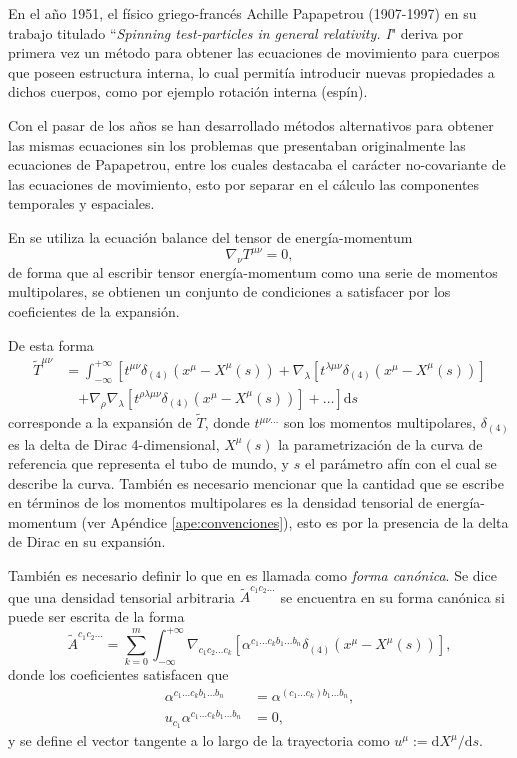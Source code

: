 En el año 1951, el físico griego-francés Achille Papapetrou (1907-1997) en su trabajo titulado ``\textit{Spinning test-particles in general relativity. I}" \cite{Papapetrou2,Papapetrou1} deriva por primera vez un método para obtener las ecuaciones de movimiento para cuerpos que poseen estructura interna, lo cual permitía introducir nuevas propiedades a dichos cuerpos, como por ejemplo rotación interna (espín). 

Con el pasar de los años se han desarrollado métodos alternativos para obtener las mismas ecuaciones sin los problemas que presentaban originalmente las ecuaciones de Papapetrou, entre los cuales destacaba el carácter no-covariante de las ecuaciones de movimiento, esto por separar en el cálculo las componentes temporales y espaciales.

En \cite{Steinhoff-Puetzfeld} se utiliza la ecuación balance del tensor de energía-momentum
\begin{equation}
\label{eq:22}
\nabla_{\nu} T^{\mu \nu} = 0,
\end{equation}
de forma que al escribir tensor energía-momentum como una serie de momentos multipolares, se obtienen un conjunto de condiciones a satisfacer por los coeficientes de la expansión. 

De esta forma
\begin{align}
\nonumber
\tilde{T}^{\mu \nu} &= \int^{+\infty}_{-\infty} \left[ t^{\mu \nu} \delta_{(4)}(x^{\mu} - X^{\mu}(s)) + \nabla_{\lambda} [t^{\lambda \mu \nu} \delta_{(4)}(x^{\mu} - X^{\mu}(s))] \right.\\
&\quad \left.  + \nabla_{\rho} \nabla_{\lambda} [t^{\rho \lambda \mu \nu} \delta_{(4)}(x^{\mu} - X^{\mu}(s))] +  \dots
\right] \mathrm{d}s
\end{align}
corresponde a la expansión de $\tilde{T}$, donde $t^{\mu \nu \dots}$ son los momentos multipolares, $\delta_{(4)}$ es la delta de Dirac 4-dimensional, $X^{\mu}(s)$ la parametrización de la curva de referencia que representa el tubo de mundo, y $s$ el parámetro afín con el cual se describe la curva. También es necesario mencionar que la cantidad que se escribe en términos de los momentos multipolares es la densidad tensorial de energía-momentum (ver Apéndice \ref{ape:convenciones}), esto es por la presencia de la delta de Dirac en su expansión.

También es necesario definir lo que en \cite{Tulczyjew} es llamada como \textit{forma canónica}. Se dice que una densidad tensorial arbitraria $\tilde{A}^{c_1 c_2 \dots}$ se encuentra en su forma canónica si puede ser escrita de la forma
\begin{equation}
\tilde{A}^{c_1 c_2 \dots} = \sum_{k=0}^{m} \int_{-\infty}^{+\infty} \nabla_{c_1 c_2 \dots c_k} \left[ \alpha^{c_1 \dots c_k b_1 \dots b_n} \delta_{(4)}(x^{\mu} - X^{\mu}(s)) \right], 
\end{equation}
donde los coeficientes satisfacen que
\begin{align}
\alpha^{c_1 \dots c_k b_1 \dots b_n} &= \alpha^{(c_1 \dots c_k) b_1 \dots b_n},\\
u_{c_1}\alpha^{c_1 \dots c_k b_1 \dots b_n} &= 0,
\end{align}
y se define el vector tangente a lo largo de la trayectoria como $u^{\mu} := \mathrm{d}X^{\mu} / \mathrm{d}s$.

